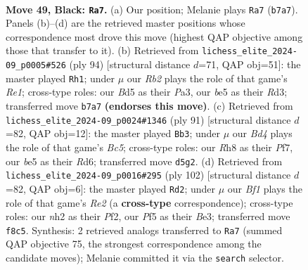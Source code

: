 \documentclass[11pt]{article}
\begin{document}
\clearpage

\begin{figure}[p]\centering
\begin{subfigure}{0.46\textwidth}\centering
\resizebox{\linewidth}{!}{%
\newchessgame
\chessboard[
  setfen={5b1r/1r1k2p1/p1p5/Pp1bBp1p/2p2P1P/4P1P1/1P2K2N/R5R1 b - - 0 49},
  showmover=false,
  pgfstyle=straightmove, color=movearrow, markmove={b7-a7}
]}
\caption{}
\end{subfigure}\hfill
\begin{subfigure}{0.46\textwidth}\centering
\resizebox{\linewidth}{!}{%
\newchessgame
\chessboard[
  setfen={4r1r1/2kb1p2/4p1p1/1p1pP2p/pP3P2/P1PR2P1/4B2P/2K1R3 w - - 35 48},
  showmover=false,
  pgfstyle=straightmove, color=movearrow, markmove={e1-h1}
]}
\caption{}
\end{subfigure}
\\[4pt]
\begin{subfigure}{0.46\textwidth}\centering
\resizebox{\linewidth}{!}{%
\newchessgame
\chessboard[
  setfen={2k5/2p2p2/2pr2p1/p5Pp/P1bBP2P/2P2PK1/3r4/R3R3 b - - 42 46},
  showmover=false,
  pgfstyle=straightmove, color=movearrow, markmove={c4-b3}
]}
\caption{}
\end{subfigure}\hfill
\begin{subfigure}{0.46\textwidth}\centering
\resizebox{\linewidth}{!}{%
\newchessgame
\chessboard[
  setfen={8/3R4/r2b1kp1/r3pp1p/1p5P/1P2B1P1/P3RP2/6K1 w - - 10 52},
  showmover=false,
  pgfstyle=straightmove, color=movearrow, markmove={e2-d2}
]}
\caption{}
\end{subfigure}
\caption{\textbf{Move 49, Black: \texttt{Ra7}.} (a) Our position; Melanie plays \texttt{Ra7} (\texttt{b7a7}). Panels (b)--(d) are the retrieved master positions whose correspondence most drove this move (highest QAP objective among those that transfer to it). (b) Retrieved from \texttt{lichess\_elite\_2024-09\_p0005\#526} (ply 94) [structural distance $d$=71, QAP obj=51]: the master played \texttt{Rh1}; under $\mu$ our \emph{Rb2} plays the role of that game's \emph{Re1}; cross-type roles: our \emph{B}d5 as their \emph{P}a3, our \emph{b}e5 as their \emph{R}d3; transferred move \texttt{b7a7} \textbf{(endorses this move)}. (c) Retrieved from \texttt{lichess\_elite\_2024-09\_p0024\#1346} (ply 91) [structural distance $d$=82, QAP obj=12]: the master played \texttt{Bb3}; under $\mu$ our \emph{Bd4} plays the role of that game's \emph{Bc5}; cross-type roles: our \emph{R}h8 as their \emph{P}f7, our \emph{b}e5 as their \emph{R}d6; transferred move \texttt{d5g2}. (d) Retrieved from \texttt{lichess\_elite\_2024-09\_p0016\#295} (ply 102) [structural distance $d$=82, QAP obj=6]: the master played \texttt{Rd2}; under $\mu$ our \emph{Bf1} plays the role of that game's \emph{Re2} (a \textbf{cross-type} correspondence); cross-type roles: our \emph{n}h2 as their \emph{P}f2, our \emph{P}f5 as their \emph{B}e3; transferred move \texttt{f8c5}. Synthesis: 2 retrieved analogs transferred to \texttt{Ra7} (summed QAP objective 75, the strongest correspondence among the candidate moves); Melanie committed it via the \texttt{search} selector.}
\label{fig:thought-m97}
\end{figure}
\end{document}
